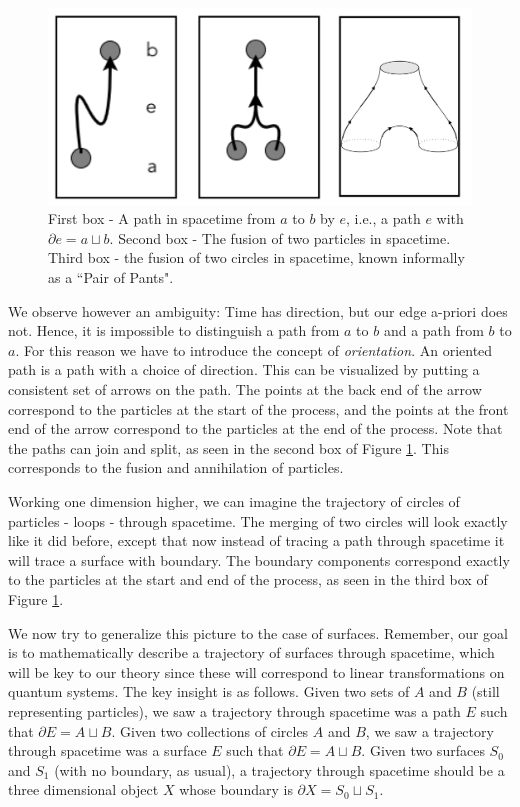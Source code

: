 \documentclass{article}
\theoremstyle{definition}
\numberwithin{figure}{section}
\begin{document}
\begin{figure}
\begin{center}
\includegraphics[scale=0.40]{cobordism}
\caption{First box - A path in spacetime from $a$ to $b$ by $e$, i.e., a path $e$ with $\partial e= a \sqcup b$. Second box - The fusion of two particles in spacetime. Third box - the fusion of two circles in spacetime, known informally as a ``Pair of Pants".}
\label{fig:bordism}
\end{center}
\end{figure}

We observe however an ambiguity: Time has direction, but our edge a-priori does not. Hence, it is impossible to distinguish a path from $a$ to $b$ and a path from $b$ to $a$. For this reason we have to introduce the concept of \textit{orientation}. An oriented path is a path with a choice of direction. This can be visualized by putting a consistent set of arrows on the path. The points at the back end of the arrow correspond to the particles at the start of the process, and the points at the front end of the arrow correspond to the particles at the end of the process. Note that the paths can join and split, as seen in the second box of Figure  \ref{fig:bordism}. This corresponds to the fusion and annihilation of particles.

Working one dimension higher, we can imagine the trajectory of circles of particles - loops - through spacetime. The merging of two circles will look exactly like it did before, except that now instead of tracing a path through spacetime it will trace a surface with boundary. The boundary components correspond exactly to the particles at the start and end of the process, as seen in the third box of Figure \ref{fig:bordism}.

We now try to generalize this picture to the case of surfaces. Remember, our goal is to mathematically describe a trajectory of surfaces through spacetime, which will be key to our theory since these will correspond to linear transformations on quantum systems. The key insight is as follows. Given two sets of $A$ and $B$ (still representing particles), we saw a trajectory through spacetime was a path $E$ such that $\partial E=A\sqcup B$. Given two collections of circles $A$ and $B$, we saw a trajectory through spacetime was a surface $E$ such that $\partial E=A\sqcup B$. Given two surfaces $S_0$ and $S_1$ (with no boundary, as usual), a trajectory through spacetime should be a three dimensional object $X$ whose boundary is $\partial X= S_0\sqcup S_1$.
\end{document}
